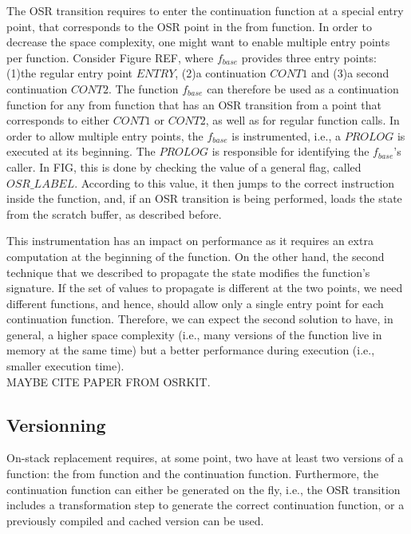 
The OSR transition requires to enter the continuation function at a special entry point, that corresponds to the OSR point in the from function.
In order to decrease the space complexity, one might want to enable multiple entry points per function.
Consider Figure REF, where $f_{base}$ provides three entry points: (1)the regular entry point $ENTRY$, (2)a continuation $CONT1$ and (3)a second continuation $CONT2$.
The function $f_{base}$ can therefore be used as a continuation function for any from function that has an OSR transition from a point that corresponds to either $CONT1$ or $CONT2$, as well as for regular function calls.
In order to allow multiple entry points, the $f_{base}$ is instrumented, i.e., a $PROLOG$ is executed at its beginning.
The $PROLOG$ is responsible for identifying the $f_{base}$'s caller. 
In FIG, this is done by checking the value of a general flag, called $OSR\_LABEL$.
According to this value, it then jumps to the correct instruction inside the function, and, if an OSR transition is being performed, loads the state from the scratch buffer, as described before.

This instrumentation has an impact on performance as it requires an extra computation at the beginning of the function. 
On the other hand, the second technique that we described to propagate the state modifies the function's signature.
If the set of values to propagate is different at the two points, we need different functions, and hence, should allow only a single entry point for each continuation function.
Therefore, we can expect the second solution to have, in general, a higher space complexity (i.e., many versions of the function live in memory at the same time) but a better performance during execution (i.e., smaller execution time).\\
MAYBE CITE PAPER FROM OSRKIT.

\subsection{Versionning}
On-stack replacement requires, at some point, two have at least two versions of a function: the from function and the continuation function.
Furthermore, the continuation function can either be generated on the fly, i.e., the OSR transition includes a transformation step to generate the correct continuation function, or a previously compiled and cached version can be used.

